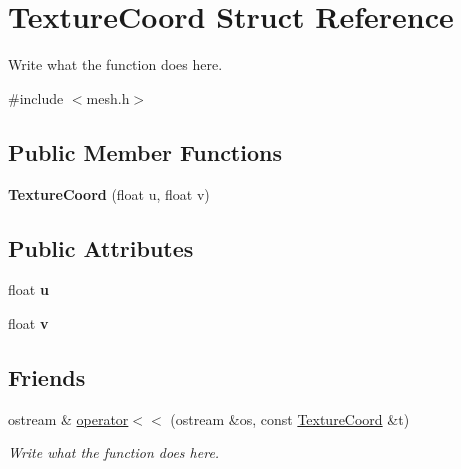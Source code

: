 \hypertarget{structTextureCoord}{\section{Texture\+Coord Struct Reference}
\label{structTextureCoord}
}


Write what the function does here.  




{\ttfamily \#include $<$mesh.\+h$>$}

\subsection*{Public Member Functions}
\begin{DoxyCompactItemize}
\item 
\hypertarget{structTextureCoord_a244f496ea94cf6a50be632a3ef7d36d2}{{\bfseries Texture\+Coord} (float u, float v)}\label{structTextureCoord_a244f496ea94cf6a50be632a3ef7d36d2}

\end{DoxyCompactItemize}
\subsection*{Public Attributes}
\begin{DoxyCompactItemize}
\item 
\hypertarget{structTextureCoord_ae64022a50d7a8c1522f1f07631135804}{float {\bfseries u}}\label{structTextureCoord_ae64022a50d7a8c1522f1f07631135804}

\item 
\hypertarget{structTextureCoord_af26c9cf30246ac6451d981bb836ae4b1}{float {\bfseries v}}\label{structTextureCoord_af26c9cf30246ac6451d981bb836ae4b1}

\end{DoxyCompactItemize}
\subsection*{Friends}
\begin{DoxyCompactItemize}
\item 
ostream \& \hyperlink{structTextureCoord_a30143be17ec2f3bbe4df4424e4ac8fb6}{operator$<$$<$} (ostream \&os, const \hyperlink{structTextureCoord}{Texture\+Coord} \&t)
\begin{DoxyCompactList}\small\item\em Write what the function does here. \end{DoxyCompactList}\end{DoxyCompactItemize}


